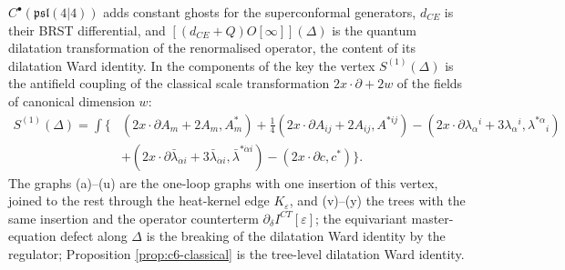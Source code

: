 \begin{remark}
$C^\bullet(\mathfrak{psl}(4|4))$ adds constant ghosts for the superconformal generators, $d_{CE}$ is their BRST differential, and $[(d_{CE}+Q)O[\infty]](\Delta)$ is the quantum dilatation transformation of the renormalised operator, the content of its dilatation Ward identity. In the components of the key the vertex $S^{(1)}(\Delta)$ is the antifield coupling of the classical scale transformation $2x\cdot\partial+2w$ of the fields of canonical dimension $w$:
\[
\begin{aligned}
S^{(1)}(\Delta)=\int\big\{&(2x\cdot\partial A_m+2A_m,A^*_m)+\tfrac14(2x\cdot\partial A_{ij}+2A_{ij},A^{*ij})-(2x\cdot\partial\lambda_\alpha{}^i+3\lambda_\alpha{}^i,\lambda^{*\alpha}{}_i)\\
&+(2x\cdot\partial\bar\lambda_{\dot\alpha i}+3\bar\lambda_{\dot\alpha i},\bar\lambda^{*\dot\alpha i})-(2x\cdot\partial c,c^*)\big\}.
\end{aligned}
\]
The graphs (a)--(u) are the one-loop graphs with one insertion of this vertex, joined to the rest through the heat-kernel edge $K_\varepsilon$, and (v)--(y) the trees with the same insertion and the operator counterterm $\partial_\delta I^{CT}[\varepsilon]$; the equivariant master-equation defect along $\Delta$ is the breaking of the dilatation Ward identity by the regulator; Proposition \ref{prop:c6-classical} is the tree-level dilatation Ward identity.
\end{remark}
